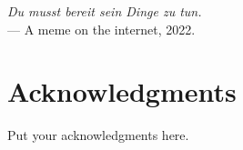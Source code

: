
\begin{flushright}{\slshape
    Du musst bereit sein Dinge zu tun.} \\ \medskip
    --- A meme on the internet, 2022.
\end{flushright}



\bigskip

\begingroup
\let\clearpage\relax
\let\cleardoublepage\relax
\let\cleardoublepage\relax
\chapter*{Acknowledgments}
Put your acknowledgments here.
\endgroup